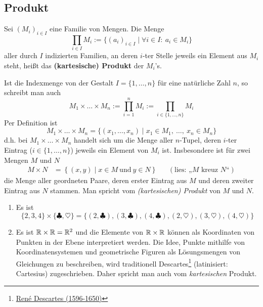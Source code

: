 \subsection*{Produkt}


\begin{de}  
    Sei $(M_i)_{i\in I}$ eine Familie von Mengen. Die Menge
        \[ \prod_{i\in I} M_i := \{ (a_i)_{i\in I} \mid \forall i\in I:\ a_i\in M_i \} \]
    aller durch $I$ indizierten Familien, an deren $i$-ter Stelle jeweils ein Element aus $M_i$ steht, heißt das \textbf{(kartesische) Produkt} der $M_i$'s.

    Ist die Indexmenge von der Gestalt $I=\{1,\dots , n\}$ für eine natürliche Zahl $n$, so schreibt man auch
        \[ M_1\times\ldots\times M_n := \prod_{i=1}^n M_i := \prod_{i\in \{1,\dots , n\}} M_i   \]
    Per Definition ist
        \[ M_1\times\ldots\times M_n = \{ (x_1,\dots , x_n) \mid x_1\in M_1,\ \ldots,\ x_n\in M_n \} \]
    d.h. bei $M_1\times\ldots\times M_n$ handelt sich um die Menge aller $n$-Tupel, deren $i$-ter Eintrag ($i\in \{1,\dots , n\}$) jeweils ein Element von $M_i$ ist.
    Insbesondere ist für zwei Mengen $M$ und $N$
    \begin{align*}
        M \times N & = \left\{ (x,y) \mid x\in M\ \text{und}\ y\in N \right\}  && (\text{lies: „$M$ kreuz $N$“})
    \end{align*}
    die Menge aller geordneten Paare, deren erster Eintrag aus $M$ und deren zweiter Eintrag aus $N$ stammen. Man spricht vom \emph{(kartesischen) Produkt} von $M$ und $N$.
\end{de}


\begin{bsp} \quad
    \begin{enumerate}
        \item Es ist
            \[ \{2,3,4\}\times \{ \clubsuit,\heartsuit\} = \{ (2,\clubsuit), (3,\clubsuit), (4,\clubsuit), (2,\heartsuit), (3,\heartsuit), (4,\heartsuit) \}\]
        \item Es ist $\mathbb R\times \mathbb R=\mathbb R^2$ und die Elemente von $\mathbb R\times \mathbb R$ können als Koordinaten von Punkten in der Ebene interpretiert werden. Die Idee, Punkte mithilfe von Koordinatensystemen und geometrische Figuren als Lösungsmengen von Gleichungen zu beschreiben, wird traditionell Descartes\footnote{\href{https://de.wikipedia.org/wiki/Rene_Descartes}{René Descartes (1596-1650)}} (latinisiert: Cartesius) zugeschrieben. Daher spricht man auch vom \emph{kartesischen} Produkt.
    \end{enumerate}
\end{bsp}


